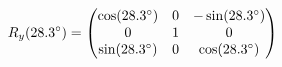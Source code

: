 \documentclass[preview]{standalone}
\begin{document}
\begin{align*}
\special{dvisvgm:raw <g id='unique000'>}R_y(28.3^\circ) = \begin{pmatrix} \cos(28.3^\circ) & 0 & -\sin(28.3^\circ) \\ 0 & 1 & 0 \\ \sin(28.3^\circ) & 0 & \cos(28.3^\circ) \end{pmatrix}\special{dvisvgm:raw </g>}
\end{align*}
\end{document}
